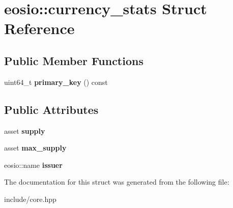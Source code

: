 \hypertarget{structeosio_1_1currency__stats}{}\section{eosio\+:\+:currency\+\_\+stats Struct Reference}
\label{structeosio_1_1currency__stats}
\subsection*{Public Member Functions}
\begin{DoxyCompactItemize}
\item 
\mbox{\label{structeosio_1_1currency__stats_a2b4a46a36579a5befc1c01259abe5de9}} 
uint64\+\_\+t {\bfseries primary\+\_\+key} () const
\end{DoxyCompactItemize}
\subsection*{Public Attributes}
\begin{DoxyCompactItemize}
\item 
\mbox{\label{structeosio_1_1currency__stats_ab9d0d983e2ea32d5280eda2cc1bd80db}} 
asset {\bfseries supply}
\item 
\mbox{\label{structeosio_1_1currency__stats_ad937f1ad8f29c4160f0925afb347a2df}} 
asset {\bfseries max\+\_\+supply}
\item 
\mbox{\label{structeosio_1_1currency__stats_a858c9e9debf28684347623e27824b710}} 
eosio\+::name {\bfseries issuer}
\end{DoxyCompactItemize}


The documentation for this struct was generated from the following file\+:\begin{DoxyCompactItemize}
\item 
include/core.\+hpp\end{DoxyCompactItemize}
